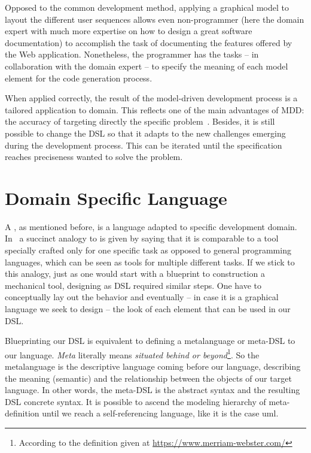 Opposed to the common development method, applying a graphical model to layout the different user sequences allows even non-programmer (here the domain expert with much more expertise on how to design a great software documentation) to accomplish the task of documenting the features offered by the Web application. Nonetheless, the programmer has the tasks -- in collaboration with the domain expert -- to specify the meaning of each model element for the code generation process. 

When applied correctly, the result of the model-driven development process is a tailored application to domain. This reflects one of the main advantages of MDD: the accuracy of targeting directly the specific problem~\cite{brambilla2017model}. Besides, it is still possible to change the DSL so that it adapts to the new challenges emerging during the development process. This can be iterated until the specification reaches preciseness wanted to solve the problem.

\section{Domain Specific Language}\label{sec:DSL}

A , as mentioned before, is a language adapted to specific development domain. In~\cite{Naujokat2018} a succinct analogy to  is given by saying that it is comparable to a tool specially crafted only for one specific task as opposed to general programming languages, which can be seen as tools for multiple different tasks. If we stick to this analogy, just as one would start with a blueprint to construction a mechanical tool, designing as DSL required similar steps. One have to conceptually lay out the behavior and eventually -- in case it is a graphical language we seek to design -- the look of each element that can be used in our DSL.

Blueprinting our DSL is equivalent to defining a metalanguage or meta-DSL to our language. \textit{Meta} literally means \textit{situated behind or beyond}\footnote{According to the definition given at \url{https://www.merriam-webster.com/}}. So the metalanguage is the descriptive language coming before our language, describing the meaning (semantic) and the relationship between the objects of our target language. In other words, the meta-DSL is the abstract syntax and the resulting DSL concrete syntax. It is possible to ascend the modeling hierarchy of meta-definition until we reach a self-referencing language, like it is the case \gls{uml}.

